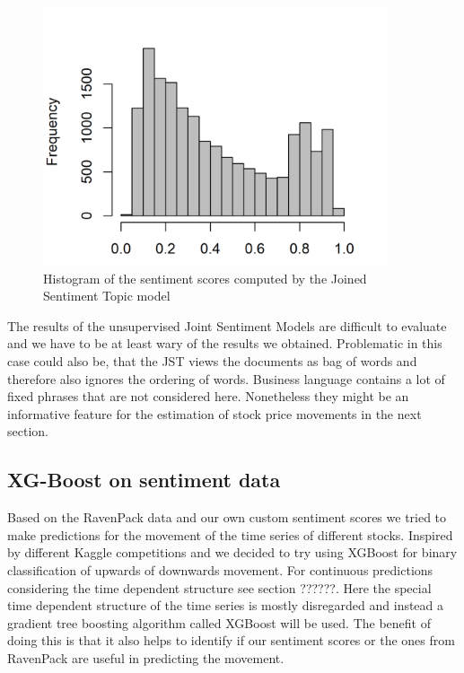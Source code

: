 \begin{figure}[h]
\centering
\includegraphics[width=4in]{figures/2SentimentsJST_Histogram.png}
\caption{Histogram of the sentiment scores computed by the Joined Sentiment Topic model}
\label{fig:JSTSentiment}
\end{figure}
The results of the unsupervised Joint Sentiment Models are difficult to evaluate and we have to be at least wary of the results we obtained. Problematic in this case could also be, that the JST views the documents as bag of words and therefore also ignores the ordering of words. Business language contains a lot of fixed phrases that are not considered here.  Nonetheless they might be an informative feature for the estimation of stock price movements in the next section. 


\subsection{XG-Boost on sentiment data}
Based on the RavenPack data and our own custom sentiment scores we tried to make predictions for the movement of the time series of different stocks. Inspired by different Kaggle competitions and \citep{li2018predicting} we decided to try using XGBoost for binary classification of upwards of downwards movement. For continuous predictions considering the time dependent structure see section ??????. Here the special time dependent structure of the time series is mostly disregarded and instead a gradient tree boosting algorithm called XGBoost will be used. The benefit of doing this is that it also helps to identify if our sentiment scores or the ones from RavenPack are useful in predicting the movement. 

